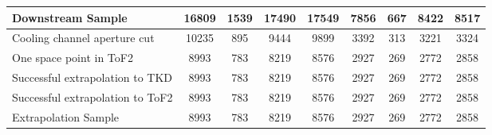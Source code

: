 \begin{landscape}
\begin{table}
\begin{tabular}[pos]{l|cccccccc}
\hline                                            
Downstream Sample                                  &   16809  &    1539  &   17490  &   17549  &    7856  &     667  &    8422  &    8517  \\
\hline                                            
Cooling channel aperture cut                       &   10235  &     895  &    9444  &    9899  &    3392  &     313  &    3221  &    3324  \\
One space point in ToF2                            &    8993  &     783  &    8219  &    8576  &    2927  &     269  &    2772  &    2858  \\
Successful extrapolation to TKD                    &    8993  &     783  &    8219  &    8576  &    2927  &     269  &    2772  &    2858  \\
Successful extrapolation to ToF2                   &    8993  &     783  &    8219  &    8576  &    2927  &     269  &    2772  &    2858  \\
\hline                                            
Extrapolation Sample                               &    8993  &     783  &    8219  &    8576  &    2927  &     269  &    2772  &    2858  \\
\hline                                            

\end{tabular}
\end{table}
\end{landscape}

